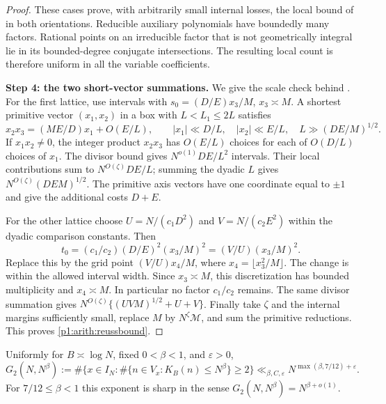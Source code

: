 \begin{proof}
These cases prove, with arbitrarily small internal losses, the local
bound of \cite[Lemma~8]{reuss2014} in both orientations.  Reducible
auxiliary polynomials have boundedly many factors.  Rational points on
an irreducible factor that is not geometrically integral lie in its
bounded-degree conjugate intersections.  The resulting local count is
therefore uniform in all the variable coefficients.

\medskip\noindent
\textbf{Step 4: the two short-vector summations.}
We give the scale check behind \cite[Section~2.3]{reuss2014}.
For the first lattice, use intervals with
$s_0=(D/E)x_3/M$, $x_3\asymp M$.  A shortest primitive vector
$(x_1,x_2)$ in a box with $L<L_1\leq2L$ satisfies
\[
 x_2x_3=(ME/D)x_1+O(E/L),\qquad
 |x_1|\ll D/L,\quad |x_2|\ll E/L,
 \quad L\gg(DE/M)^{1/2}.
\]
If $x_1x_2\ne0$, the integer product $x_2x_3$ has $O(E/L)$
choices for each of $O(D/L)$ choices of $x_1$.  The divisor bound gives
$N^{o(1)}DE/L^2$ intervals.  Their local contributions sum to
$N^{O(\zeta)}DE/L$; summing the dyadic $L$ gives
$N^{O(\zeta)}(DE M)^{1/2}$.  The primitive axis vectors have one
coordinate equal to $\pm1$ and give the additional costs $D+E$.

For the other lattice choose $U=N/(c_1D^2)$ and $V=N/(c_2E^2)$
within the dyadic comparison constants.  Then
\[
 t_0=(c_1/c_2)(D/E)^2(x_3/M)^2
     =(V/U)(x_3/M)^2.
\]
Replace this by the grid point $(V/U)x_4/M$, where
$x_4=\lfloor x_3^2/M\rfloor$.  The change is within the allowed
interval width.  Since $x_3\asymp M$, this discretization has bounded
multiplicity and $x_4\asymp M$.  In particular no factor $c_1/c_2$
remains.  The same divisor summation gives
$N^{O(\zeta)}\{(UV M)^{1/2}+U+V\}$.
Finally take $\zeta$ and the internal margins sufficiently small,
replace $M$ by $N^\zeta\mathcal M$, and sum the primitive reductions.
This proves \eqref{p1:arith:reussbound}.
\end{proof}

\begin{lemma}\label{p1:arith:twokernel}
Uniformly for $B\asymp\log N$, fixed $0<\beta<1$, and $\varepsilon>0$,
\[
 G_2(N,N^\beta):=
 \#\{x\in I_N:\#\{n\in V_x:K_B(n)\leq N^\beta\}\geq2\}
 \ll_{\beta,C,\varepsilon}N^{\max(\beta,7/12)+\varepsilon}.
\]
For $7/12\leq\beta<1$ this exponent is sharp in the sense
$G_2(N,N^\beta)=N^{\beta+o(1)}$.
\end{lemma}

